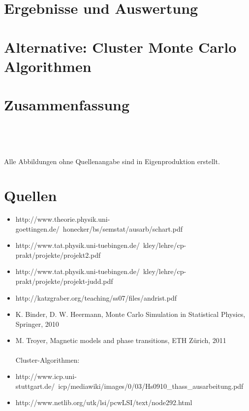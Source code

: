 \documentclass[12pt,a4paper, german]{article}
\begin{document}
\section{Ergebnisse und Auswertung}

\newpage
\section{Alternative: Cluster Monte Carlo Algorithmen}

\newpage
\section{Zusammenfassung}

\newpage
\listoffigures

\

\

Alle Abbildungen ohne Quellenangabe sind in Eigenproduktion erstellt.


\section*{Quellen}
\begin{itemize}
\item http://www.theorie.physik.uni-goettingen.de/~honecker/bs/semstat/ausarb/schart.pdf
\item http://www.tat.physik.uni-tuebingen.de/~kley/lehre/cp-prakt/projekte/projekt2.pdf
\item http://www.tat.physik.uni-tuebingen.de/~kley/lehre/cp-prakt/projekte/projekt-judd.pdf
\item http://katzgraber.org/teaching/ss07/files/andrist.pdf
\item K. Binder, D. W. Heermann, Monte Carlo Simulation in Statistical Physics, Springer, 2010
\item M. Troyer, Magnetic models and phase transitions, ETH Zürich, 2011\\\\
Cluster-Algorithmen:
\item http://www.icp.uni-stuttgart.de/~icp/mediawiki/images/0/03/Hs0910_thass_ausarbeitung.pdf
\item 
http://www.netlib.org/utk/lsi/pcwLSI/text/node292.html
\end{itemize}
\newpage
\end{document}

